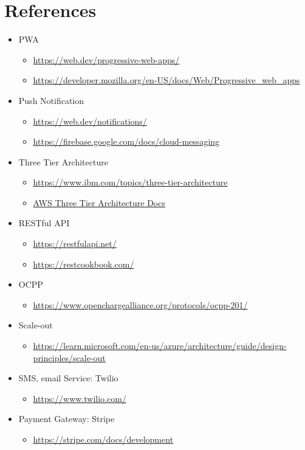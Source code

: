 \section{References}
\begin{itemize}
    \item PWA
    \begin{itemize}
        \item \url{https://web.dev/progressive-web-apps/}
        \item \url{https://developer.mozilla.org/en-US/docs/Web/Progressive_web_apps}
    \end{itemize}
    \item Push Notification
    \begin{itemize}
        \item \url{https://web.dev/notifications/}
        \item \url{https://firebase.google.com/docs/cloud-messaging}
    \end{itemize}
    \item Three Tier Architecture
    \begin{itemize}
        \item \url{https://www.ibm.com/topics/three-tier-architecture}
        \item \href{https://docs.aws.amazon.com/whitepapers/latest/serverless-multi-tier-architectures-api-gateway-lambda/three-tier-architecture-overview.html}{AWS Three Tier Architecture Docs}
    \end{itemize}
    \item RESTful API
    \begin{itemize}
        \item \url{https://restfulapi.net/}
        \item \url{https://restcookbook.com/}
    \end{itemize}
    \item OCPP
    \begin{itemize}
        \item \url{https://www.openchargealliance.org/protocols/ocpp-201/}
    \end{itemize}
    \item Scale-out
    \begin{itemize}
        \item \url{https://learn.microsoft.com/en-us/azure/architecture/guide/design-principles/scale-out}
    \end{itemize}
    \item SMS, email Service: Twilio
    \begin{itemize}
        \item \url{https://www.twilio.com/}
    \end{itemize}
    \item Payment Gateway: Stripe
    \begin{itemize}
        \item \url{https://stripe.com/docs/development}
    \end{itemize}
\end{itemize}